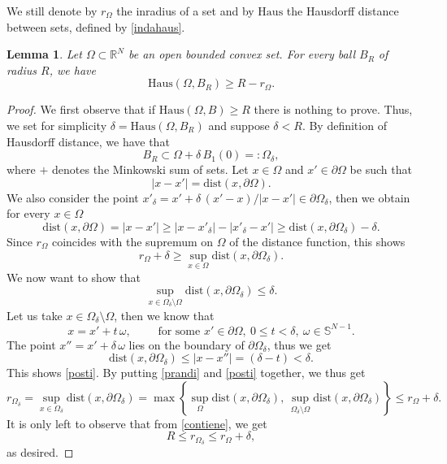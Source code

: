 \documentclass{amsart}
\newtheorem{lemma}{Lemma}[section]
\theoremstyle{definition}
\numberwithin{equation}{section}
\begin{document}
We still denote by $r_\Omega$ the inradius of a set and by $\mathrm{Haus}$ the Hausdorff distance between sets, defined by \eqref{indahaus}.
\begin{lemma}
\label{lm:blasphemy}
Let $\Omega\subset\mathbb{R}^N$ be an open bounded convex set. For every ball $B_R$ of radius $R$, we have
\[
\mathrm{Haus}(\Omega,B_R)\ge R-r_\Omega.
\]
\end{lemma}
\begin{proof}
We first observe that if $\mathrm{Haus}(\Omega,B)\ge R$ there is nothing to prove. Thus, we set for simplicity $\delta=\mathrm{Haus}(\Omega,B_R)$ and suppose $\delta <R$. By definition of Hausdorff distance, we have that
\begin{equation}
\label{contiene}
B_R\subset \Omega+\delta\,B_1(0)=:\Omega_\delta,
\end{equation}
where $+$ denotes the Minkowski sum of sets. Let $x\in\Omega$ and $x'\in\partial\Omega$ be such that 
\[
|x-x'|=\mathrm{dist}(x,\partial\Omega).
\]
We also consider the point $x'_\delta=x'+\delta\,(x'-x)/|x-x'|\in\partial\Omega_\delta$, then we obtain for every $x\in\Omega$
\[
\mathrm{dist}(x,\partial\Omega)=|x-x'|\ge |x-x'_\delta|-|x'_\delta-x'|\ge \mathrm{dist}(x,\partial\Omega_\delta)-\delta.
\]
Since $r_\Omega$ coincides with the supremum on $\Omega$ of the distance function, this shows
\begin{equation}
\label{prandi}
r_\Omega+\delta\ge \sup_{x\in\Omega}\mathrm{dist}(x,\partial\Omega_\delta).
\end{equation}
We now want to show that
\begin{equation}
\label{posti}
\sup_{x\in\Omega_\delta\setminus \Omega}\mathrm{dist}(x,\partial\Omega_\delta)\le\delta.
\end{equation}
Let us take $x\in \Omega_\delta\setminus\Omega$, then we know that
\[
x=x'+t\,\omega,\qquad \mbox{ for some } x'\in\partial\Omega,\ 0\le t<\delta,\ \omega\in\mathbb{S}^{N-1}.
\] 
The point $x''=x'+\delta\,\omega$ lies on the boundary of $\partial\Omega_\delta$, thus we get
\[
\mathrm{dist}(x,\partial\Omega_\delta)\le |x-x''|=(\delta-t)<\delta.
\]
This shows \eqref{posti}. By putting \eqref{prandi} and \eqref{posti} together, we thus get
\[
r_{\Omega_\delta}=\sup_{x\in\Omega_\delta} \mathrm{dist}(x,\partial\Omega_\delta)=\max\left\{\sup_{\Omega} \mathrm{dist}(x,\partial\Omega_\delta),\,\sup_{\Omega_\delta\setminus \Omega} \mathrm{dist}(x,\partial\Omega_\delta)\right\}\le r_\Omega+\delta.
\]
It is only left to observe that from \eqref{contiene}, we get
\[
R\le r_{\Omega_\delta}\le r_\Omega+\delta,
\]
as desired.
\end{proof}
\end{document}
